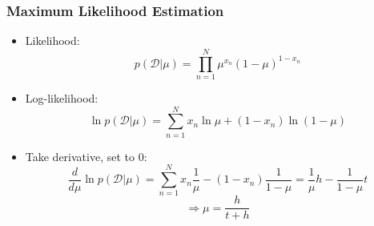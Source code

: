 \documentclass{beamer}
\begin{document}
\begin{frame}
  \frametitle{Maximum Likelihood Estimation}
  \begin{itemize}
  \item Likelihood:
    \[p(\mathcal{D}|\mu) = \prod_{n=1}^{N} \mu^{x_n} (1-\mu)^{1-x_n}\]
  \item Log-likelihood:
    \[\ln p(\mathcal{D}|\mu) = \sum_{n=1}^{N} x_n \ln \mu + (1-x_n) \ln (1-\mu)\]
  \item Take derivative, set to 0:
    \[\frac{d}{d \mu } \ln p(\mathcal{D}|\mu) = \sum_{n=1}^{N} x_n \frac{1}{\mu} - (1-x_n) \frac{1}{1-\mu}  = \frac{1}{\mu} h - \frac{1}{1-\mu} t\]
    \[\Rightarrow \mu = \frac{h}{t+h} \]
  \end{itemize}
\end{frame}
\end{document}
